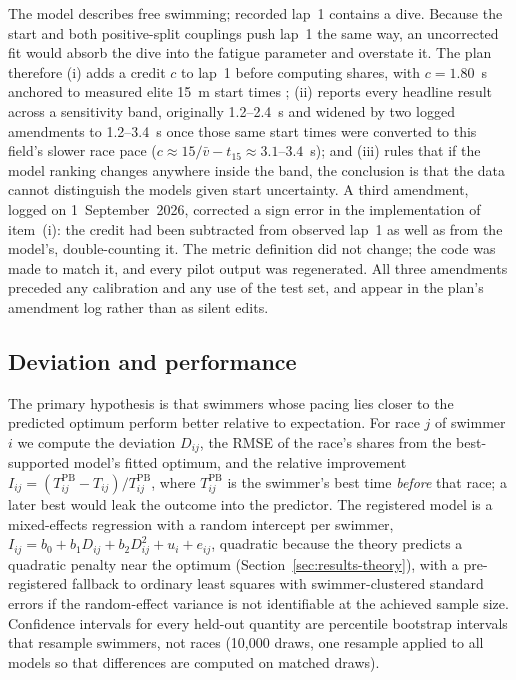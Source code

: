 The model describes free swimming; recorded lap~1 contains a dive. Because
the start and both positive-split couplings push lap~1 the same way, an
uncorrected fit would absorb the dive into the fatigue parameter and
overstate it. The plan therefore (i) adds a credit $c$ to lap~1 before
computing shares, with $c=1.80$~s anchored to measured elite 15~m start
times \citep{tor2014characteristics,rudnik2023kinematic}; (ii) reports every
headline result across a sensitivity band, originally 1.2--2.4~s and
widened by two logged amendments to 1.2--3.4~s once those same start times
were converted to this field's slower race pace
($c \approx 15/\bar v - t_{15} \approx 3.1$--$3.4$~s); and (iii) rules that
if the model ranking changes anywhere inside the band, the conclusion is
that the data cannot distinguish the models given start uncertainty. A
third amendment, logged on 1~September~2026, corrected a sign error in the
implementation of item~(i): the credit had been subtracted from observed
lap~1 as well as from the model's, double-counting it. The metric definition
did not change; the code was made to match it, and every pilot output was
regenerated. All three amendments preceded any calibration and any use of
the test set, and appear in the plan's amendment log rather than as silent
edits.

\subsection{Deviation and performance}

The primary hypothesis is that swimmers whose pacing lies closer to the
predicted optimum perform better relative to expectation. For race $j$ of
swimmer $i$ we compute the deviation $D_{ij}$, the RMSE of the race's shares
from the best-supported model's fitted optimum, and the relative improvement
$I_{ij}=(T^{\mathrm{PB}}_{ij}-T_{ij})/T^{\mathrm{PB}}_{ij}$, where
$T^{\mathrm{PB}}_{ij}$ is the swimmer's best time \emph{before} that race; a
later best would leak the outcome into the predictor. The registered model is
a mixed-effects regression with a random intercept per swimmer,
$I_{ij}=b_0+b_1 D_{ij}+b_2 D_{ij}^2+u_i+e_{ij}$, quadratic because the
theory predicts a quadratic penalty near the optimum
(Section~\ref{sec:results-theory}), with a pre-registered fallback to
ordinary least squares with swimmer-clustered standard errors if the
random-effect variance is not identifiable at the achieved sample size.
Confidence intervals for every held-out quantity are percentile bootstrap
intervals that resample swimmers, not races (10{,}000 draws, one resample
applied to all models so that differences are computed on matched draws).

